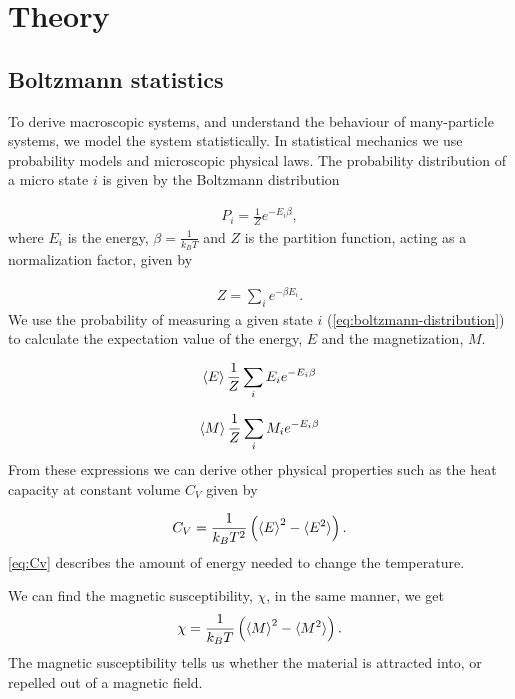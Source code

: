 \documentclass[../main.tex]{subfiles}
\begin{document}
\section{Theory}\label{sec:theory}
\subsection{Boltzmann statistics}
To derive macroscopic systems, and understand the behaviour of many-particle systems, we model the system statistically. In statistical mechanics we use probability models and microscopic physical laws. The probability distribution of a micro state $i$ is given by the Boltzmann distribution

\begin{align}
    P_i=\frac{1}{Z}e^{-E_i\beta},
    \label{eq:boltzmann-distribution}
\end{align} where $E_i$ is the energy, \ensuremath{\beta=\frac{1}{k_BT}} and $Z$ is the partition function, acting as a normalization factor, given by

\begin{align}
    Z=\sum_i e^{-\beta E_i}. 
\end{align} We use the probability of measuring a given state $i$ (\cref{eq:boltzmann-distribution}) to calculate the expectation value of the energy, $E$ and the magnetization, $M$. 

\begin{align}
    \braket{E}\frac{1}{Z}\sum_i E_i e^{-E_i\beta}
    \label{eq:exp-e}
\end{align}

\begin{align}
    \braket{M}\frac{1}{Z}\sum_i M_i e^{-E_i\beta}
    \label{eq:exp-m}
\end{align} From these expressions we can derive other physical properties such as the heat capacity at constant volume $C_V$ given by

\begin{align}
    C_V=\frac{1}{k_B T^2}\left(\braket{E}^2-\braket{E^2}\right).
    \label{eq:Cv}
\end{align} \cref{eq:Cv} describes the amount of energy needed to change the temperature. 

We can find the magnetic susceptibility, $\chi$, in the same manner, we get 
\begin{align}
    \chi = \frac{1}{k_BT}\left(\braket{M}^2-\braket{M^2}\right).
    \label{eq:chi}
\end{align} The magnetic susceptibility tells us whether the material is attracted into, or repelled out of a magnetic field. 
\end{document}
